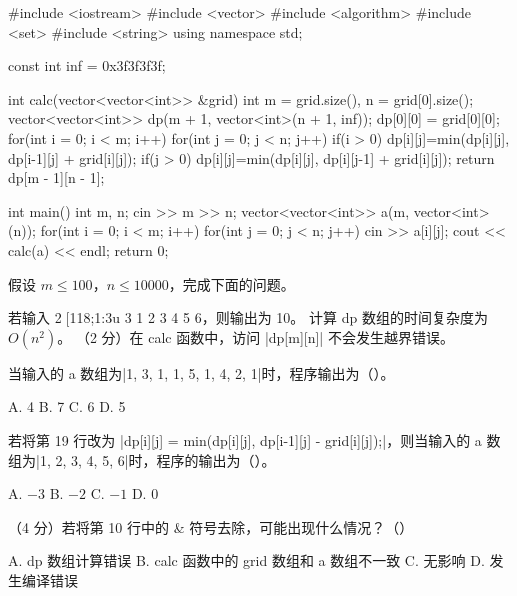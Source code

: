\documentclass{cspexam}
\begin{document}
\begin{ncode}
#include <iostream>
#include <vector>
#include <algorithm>
#include <set>
#include <string>
using namespace std;

const int inf = 0x3f3f3f3f;

int calc(vector<vector<int>> &grid)
{
    int m = grid.size(), n = grid[0].size();
    vector<vector<int>> dp(m + 1, vector<int>(n + 1, inf));
    dp[0][0] = grid[0][0];
    for(int i = 0; i < m; i++)
        for(int j = 0; j < n; j++)
        {
            if(i > 0)
                dp[i][j]=min(dp[i][j], dp[i-1][j] + grid[i][j]);
            if(j > 0)
                dp[i][j]=min(dp[i][j], dp[i][j-1] + grid[i][j]);
        }
    return dp[m - 1][n - 1];
}

int main()
{
    int m, n;
    cin >> m >> n;
    vector<vector<int>> a(m, vector<int>(n));
    for(int i = 0; i < m; i++)
        for(int j = 0; j < n; j++)
            cin >> a[i][j];
    cout << calc(a) << endl;
    return 0;
}
\end{ncode}

\vspace{0.4em}
\hspace*{\Qindent}假设 \(m\le 100\)，\(n\le 10000\)，完成下面的问题。


\Q 若输入 2[118;1:3u 3 1 2 3 4 5 6，则输出为 10。\tfend
\Q 计算 dp 数组的时间复杂度为 \(O(n^2)\)。\tfend
\Q （2 分）在 calc 函数中，访问 \co|dp[m][n]| 不会发生越界错误。\tfend


\Q 当输入的 a 数组为\co|{{1, 3, 1}, {1, 5, 1}, {4, 2, 1}}|时，程序输出为（\quad）。
\begin{optrow}
\op A. 4 \op B. 7 \op C. 6 \op D. 5
\end{optrow}

\Q 若将第 19 行改为 \co|dp[i][j] = min(dp[i][j], dp[i-1][j] - grid[i][j]);|，则当输入的 a 数组为\co|{{1, 2, 3}, {4, 5, 6}}|时，程序的输出为（\quad）。
\begin{optrow}
\op A. $-3$ \op B. $-2$ \op C. $-1$ \op D. 0
\end{optrow}

\Q （4 分）若将第 10 行中的 \& 符号去除，可能出现什么情况？（\quad）
\begin{optgrid}
\op A. dp 数组计算错误
\op B. calc 函数中的 grid 数组和 a 数组不一致
\op C. 无影响
\op D. 发生编译错误
\end{optgrid}
\end{document}
